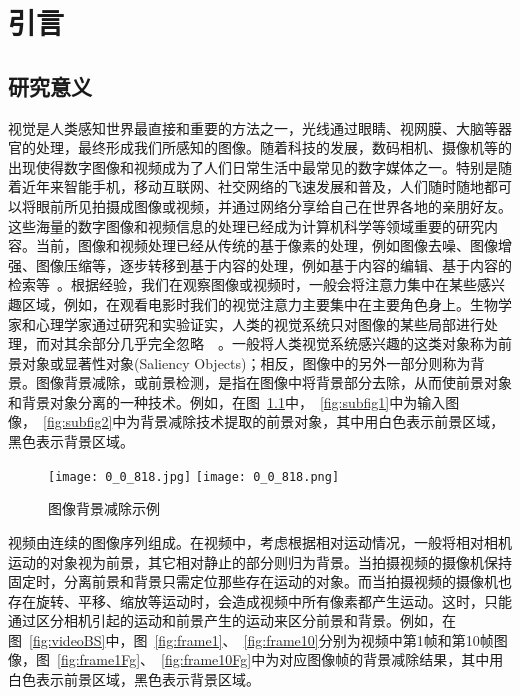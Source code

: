 \chapter{引言}
\label{cha:intro}

\section{研究意义}
\label{sec:first}
视觉是人类感知世界最直接和重要的方法之一，光线通过眼睛、视网膜、大脑等器官的处理，最终形成我们所感知的图像。随着科技的发展，数码相机、摄像机等的出现使得数字图像和视频成为了人们日常生活中最常见的数字媒体之一。特别是随着近年来智能手机，移动互联网、社交网络的飞速发展和普及，人们随时随地都可以将眼前所见拍摄成图像或视频，并通过网络分享给自己在世界各地的亲朋好友。这些海量的数字图像和视频信息的处理已经成为计算机科学等领域重要的研究内容。当前，图像和视频处理已经从传统的基于像素的处理，例如图像去噪、图像增强、图像压缩等，逐步转移到基于内容的处理，例如基于内容的编辑、基于内容的检索等~\cite{CMM12THU}。根据经验，我们在观察图像或视频时，一般会将注意力集中在某些感兴趣区域，例如，在观看电影时我们的视觉注意力主要集中在主要角色身上。生物学家和心理学家通过研究和实验证实，人类的视觉系统只对图像的某些局部进行处理，而对其余部分几乎完全忽略~\cite{treisman1980a}~\cite{Koch1985Shifts}。一般将人类视觉系统感兴趣的这类对象称为前景对象或显著性对象(Saliency Objects)；相反，图像中的另外一部分则称为背景。图像背景减除，或前景检测，是指在图像中将背景部分去除，从而使前景对象和背景对象分离的一种技术。例如，在图~\ref{fig:1}中，~\ref{fig:subfig1}中为输入图像，~\ref{fig:subfig2}中为背景减除技术提取的前景对象，其中用白色表示前景区域，黑色表示背景区域。\par
\begin{figure}[ht]
  \centering%
    {\texttt{[image: 0\_0\_818.jpg]}}%
 \hspace{1em}%
      {\texttt{[image: 0\_0\_818.png]}}
  \caption{图像背景减除示例}
  \label{fig:1}
\end{figure}
视频由连续的图像序列组成。在视频中，考虑根据相对运动情况，一般将相对相机运动的对象视为前景，其它相对静止的部分则归为背景。当拍摄视频的摄像机保持固定时，分离前景和背景只需定位那些存在运动的对象。而当拍摄视频的摄像机也存在旋转、平移、缩放等运动时，会造成视频中所有像素都产生运动。这时，只能通过区分相机引起的运动和前景产生的运动来区分前景和背景。例如，在图~\ref{fig:videoBS}中，图~\ref{fig:frame1}、~\ref{fig:frame10}分别为视频中第1帧和第10帧图像，图~\ref{fig:frame1Fg}、~\ref{fig:frame10Fg}中为对应图像帧的背景减除结果，其中用白色表示前景区域，黑色表示背景区域。
